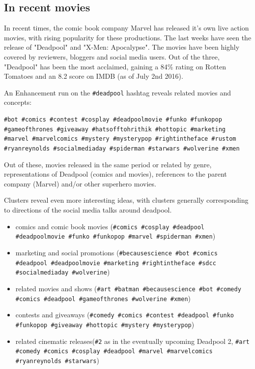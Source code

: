 \documentclass[12pt,a4paper,twoside]{report}
\begin{document}
\subsection{In recent movies}
In recent times, the comic book company Marvel has released it's own live action movies, with rising popularity for these productions. The last weeks have seen the release of "Deadpool" and "X-Men: Apocalypse". The movies have been highly covered by reviewers, bloggers and social media users. Out of the three, "Deadpool" has been the most acclaimed, gaining a 84\% rating on Rotten Tomatoes and an 8.2 score on IMDB (as of July 2nd 2016).

An Enhancement run on the \texttt{\#deadpool} hashtag reveals related movies and concepts:

\texttt{\#bot \#comics \#contest \#cosplay \#deadpoolmovie \#funko \#funkopop \#gameofthrones \#giveaway \#hatsofftohrithik \#hottopic \#marketing \#marvel \#marvelcomics \#mystery \#mysterypop \#rightintheface \#rustom \#ryanreynolds \#socialmediaday \#spiderman \#starwars \#wolverine \#xmen}

Out of these, movies released in the same period or related by genre, representations of Deadpool (comics and movies), references to the parent company (Marvel) and/or other superhero movies.

Clusters reveal even more interesting ideas, with clusters generally corresponding to directions of the social media talks around deadpool.

\begin{itemize}
\item comics and comic book movies (\texttt{\#comics \#cosplay \#deadpool \#deadpoolmovie \#funko \#funkopop \#marvel \#spiderman \#xmen})
\item marketing and social promotions (\texttt{\#becausescience \#bot \#comics \#deadpool \#deadpoolmovie \#marketing \#rightintheface \#sdcc \#socialmediaday \#wolverine})
\item related movies and shows (\texttt{\#art \#batman \#becausescience \#bot \#comedy \#comics \#deadpool \#gameofthrones \#wolverine \#xmen})
\item contests and giveaways (\texttt{\#comedy \#comics \#contest \#deadpool \#funko \#funkopop \#giveaway \#hottopic \#mystery \#mysterypop})
\item related cinematic releases(\texttt{\#2} as in the eventually upcoming Deadpool 2, \texttt{\#art \#comedy \#comics \#cosplay \#deadpool \#marvel \#marvelcomics \#ryanreynolds \#starwars})
\end{itemize}
\end{document}
